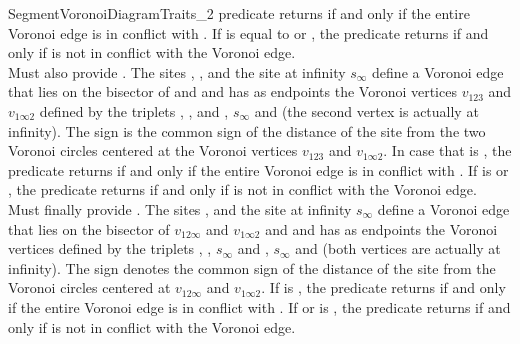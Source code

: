 \begin{ccRefConcept}{SegmentVoronoiDiagramTraits_2}
{predicate returns  if and only if the entire Voronoi edge is
in conflict with . If  is equal to  or
, the predicate returns  if and only if 
is not in conflict with the Voronoi edge.
\\
%
Must also provide . The
sites , ,  and the site at infinity
$s_\infty$ define a Voronoi edge that lies on the bisector of
 and  and has as endpoints the Voronoi vertices
$v_{123}$ and $v_{1\infty{2}}$ defined by the triplets ,
,  and , $s_\infty$ and  (the second
vertex is actually at infinity). The sign  is the common sign
of the distance of the site  from the two Voronoi circles
centered at the Voronoi vertices $v_{123}$ and $v_{1\infty{2}}$.
In case that  is , the predicate
returns  if and only if the entire Voronoi edge is in
conflict with . If  is  or ,
the predicate returns  if and only if  is not in
conflict with the Voronoi edge.
\\
%
Must finally provide . The
sites ,  and the site at infinity
$s_\infty$ define a Voronoi edge that lies on the bisector of
$v_{12\infty}$ and $v_{1\infty{}2}$
 and  and has as endpoints the Voronoi vertices
defined by the triplets , , $s_\infty$ and ,
$s_\infty$ and  (both vertices are actually at
infinity). The sign  denotes the common sign of the distance
of the site  from the Voronoi circles centered at
$v_{12\infty}$ and $v_{1\infty{}2}$.
If  is , the predicate
returns  if and only if the entire Voronoi edge is in
conflict with . If  or  is ,
the predicate returns  if and only if  is not in
conflict with the Voronoi edge.}
%
\ccGlue
{}
\end{ccRefConcept}
